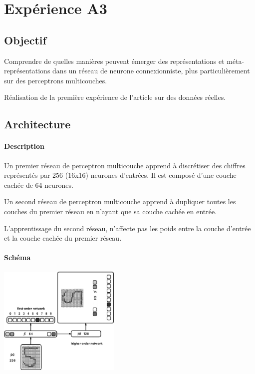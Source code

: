 \section{Expérience A3} \label{expA3}
  \subsection{Objectif}
    Comprendre de quelles manières peuvent émerger des représentations et méta-représentations dans 
    un réseau de neurone connexionniste, plus particulièrement sur des perceptrons multicouches.
    
    Réalisation de la première expérience de l'article \cite{Cleeremans_2007} sur des données réelles.
    
  \subsection{Architecture}
    \paragraph{Description}
      Un premier réseau de perceptron multicouche apprend à discrétiser des chiffres représentés
      par 256 (16x16) neurones d'entrées. Il est composé d'une couche cachée de 64 neurones.
      
      Un second réseau de perceptron multicouche apprend à dupliquer toutes les couches du premier
      réseau en n'ayant que sa couche cachée en entrée.
      
      L'apprentissage du second réseau, n'affecte pas les poids entre la couche d'entrée et la 
      couche cachée du premier réseau.

    \paragraph{Schéma}
      \begin{center}
	\includegraphics[width=220px]{data/expA3/schema.png}
      \end{center}
      
